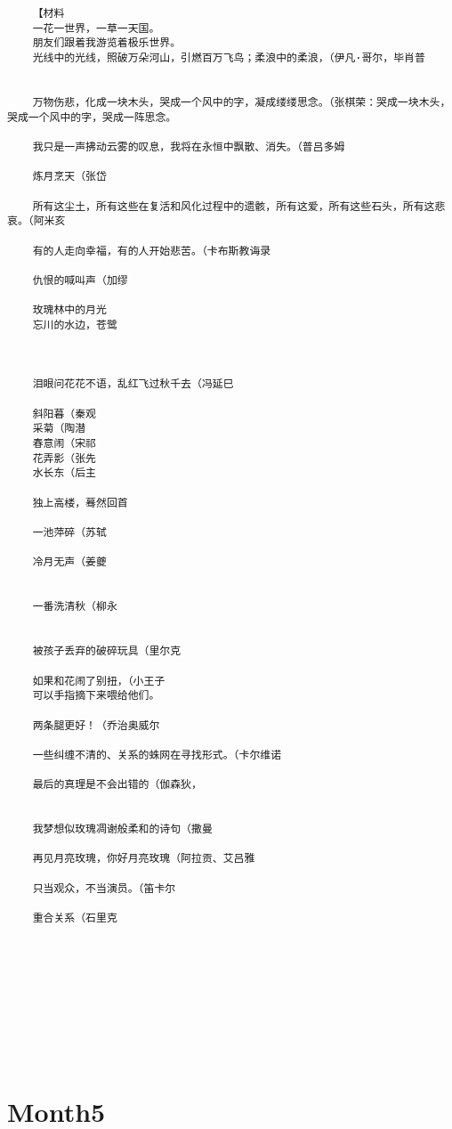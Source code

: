 \documentclass[UTF8]{Diaries}
\begin{document}
\begin{lstlisting}
    【材料
    一花一世界，一草一天国。
    朋友们跟着我游览着极乐世界。
    光线中的光线，照破万朵河山，引燃百万飞鸟；柔浪中的柔浪，（伊凡·哥尔，毕肖普
    
  
    万物伤悲，化成一块木头，哭成一个风中的字，凝成缕缕思念。（张棋荣：哭成一块木头，哭成一个风中的字，哭成一阵思念。

    我只是一声拂动云雾的叹息，我将在永恒中飘散、消失。（普吕多姆

    炼月烹天（张岱
    
    所有这尘土，所有这些在复活和风化过程中的遗骸，所有这爱，所有这些石头，所有这悲哀。（阿米亥
    
    有的人走向幸福，有的人开始悲苦。（卡布斯教诲录
    
    仇恨的喊叫声（加缪
    
    玫瑰林中的月光
    忘川的水边，苍鹭
    
    
    
    泪眼问花花不语，乱红飞过秋千去（冯延巳
    
    斜阳暮（秦观
    采菊（陶潜
    春意闹（宋祁
    花弄影（张先
    水长东（后主
    
    独上高楼，蓦然回首
    
    一池萍碎（苏轼
    
    冷月无声（姜夔
    
    
    一番洗清秋（柳永
    
    
    被孩子丢弃的破碎玩具（里尔克
    
    如果和花闹了别扭，（小王子
    可以手指摘下来喂给他们。
    
    两条腿更好！（乔治奥威尔
    
    一些纠缠不清的、关系的蛛网在寻找形式。（卡尔维诺
    
    最后的真理是不会出错的（伽森狄，
    
    
    我梦想似玫瑰凋谢般柔和的诗句（撒曼
    
    再见月亮玫瑰，你好月亮玫瑰（阿拉贡、艾吕雅
    
    只当观众，不当演员。（笛卡尔
    
    重合关系（石里克
    
    
    
    
    



    
\end{lstlisting}



\section{Month5}
\end{document}
